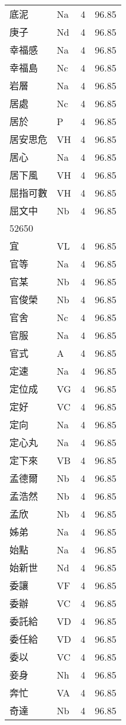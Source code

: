 \documentclass[twocolumn]{book}
\begin{document}
\begin{supertabular}{llrr}
底泥 & Na & 4 &  96.85\\
庚子 & Nd & 4 &  96.85\\
幸福感 & Na & 4 &  96.85\\
幸福島 & Nc & 4 &  96.85\\
岩層 & Na & 4 &  96.85\\
居處 & Nc & 4 &  96.85\\
居於 & P & 4 &  96.85\\
居安思危 & VH & 4 &  96.85\\
居心 & Na & 4 &  96.85\\
居下風 & VH & 4 &  96.85\\
屈指可數 & VH & 4 &  96.85\\
屈文中 & Nb & 4 &  96.85\\
52650\\
宜 & VL & 4 &  96.85\\
官等 & Na & 4 &  96.85\\
官某 & Nb & 4 &  96.85\\
官俊榮 & Nb & 4 &  96.85\\
官舍 & Nc & 4 &  96.85\\
官服 & Na & 4 &  96.85\\
官式 & A & 4 &  96.85\\
定速 & Na & 4 &  96.85\\
定位成 & VG & 4 &  96.85\\
定好 & VC & 4 &  96.85\\
定向 & Na & 4 &  96.85\\
定心丸 & Na & 4 &  96.85\\
定下來 & VB & 4 &  96.85\\
孟德爾 & Nb & 4 &  96.85\\
孟浩然 & Nb & 4 &  96.85\\
孟欣 & Nb & 4 &  96.85\\
姊弟 & Na & 4 &  96.85\\
始點 & Na & 4 &  96.85\\
始新世 & Nd & 4 &  96.85\\
委讓 & VF & 4 &  96.85\\
委辦 & VC & 4 &  96.85\\
委託給 & VD & 4 &  96.85\\
委任給 & VD & 4 &  96.85\\
委以 & VC & 4 &  96.85\\
妾身 & Nh & 4 &  96.85\\
奔忙 & VA & 4 &  96.85\\
奇達 & Nb & 4 &  96.85\\

\end{supertabular}
\end{document}
